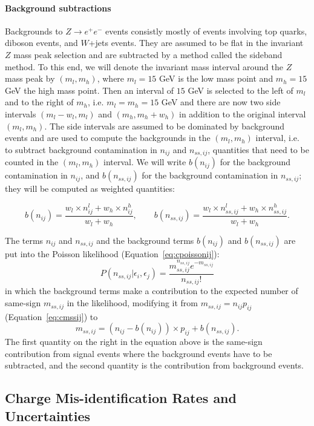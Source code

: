 \paragraph{Background subtractions} Backgrounds to $Z\to e^+e^-$ events
consistly mostly of events involving top quarks, diboson events, and $W$+jets
events. They are assumed to be flat in the invariant $Z$ mass peak selection
and are subtracted by a method called the sideband method. To this end, we will
denote the invariant mass interval around the $Z$ mass peak by $(m_l,m_h)$,
where $m_l=15$ GeV is the low mass point and $m_h=15$ GeV the high mass point.
Then an interval of $15$ GeV is selected to the left of $m_l$ and to the right
of $m_h$, i.e. $m_l = m_h = 15$ GeV and there are now two side intervals
$(m_l-w_l, m_l)$ and $(m_h, m_h+w_h)$ in addition to the original interval
$(m_l,m_h)$. The side intervals are assumed to be dominated by background
events and are used to compute the backgrounds in the $(m_l,m_h)$ interval,
i.e. to subtract background contamination in $n_{ij}$ and $n_{ss,ij}$,
quantities that need to be counted in the $(m_l,m_h)$ interval. We will write
$b(n_{ij})$ for the background contamination in $n_{ij}$, and $b(n_{ss,ij})$
for the background contamination in $n_{ss,ij}$; they will be computed as
weighted quantities:

$$
	b(n_{ij}) = \frac{w_l\times n_{ij}^l + w_h\times n_{ij}^h}{w_l + w_h}, \qquad
	b(n_{ss,ij})= \frac{w_l\times n_{ss,ij}^l + w_h \times n_{ss,ij}^h }{w_l + w_h}.
$$

The terms $n_{ij}$ and $n_{ss,ij}$ and the background terms $b(n_{ij})$ and
$b(n_{ss,ij})$ are put into the Poisson likelihood (Equation~\ref{eq:cpoissonij}):
%
$$
	P(n_{ss,ij} | \epsilon_i, \epsilon_j) = \frac{m_{ss,ij}^{n_{ss,ij}} e^{-m_{ss,ij}}}{n_{ss,ij}!}
$$
%
in which the background terms make a contribution to the expected number of
same-sign $m_{ss,ij}$ in the likelihood, modifying it from $m_{ss,ij} = n_{ij}
	p_{ij}$ (Equation~\ref{eq:cmssij}) to
%
$$
	m_{ss,ij} = (n_{ij} - b(n_{ij})) \times p_{ij} + b(n_{ss,ij}).
$$
%
The first quantity on the right in the equation above is the same-sign
contribution from signal events where the background events have to be
subtracted, and the second quantity is the contribution from background events.

\subsection{Charge Mis-identification Rates and Uncertainties}\label{s:crates}


